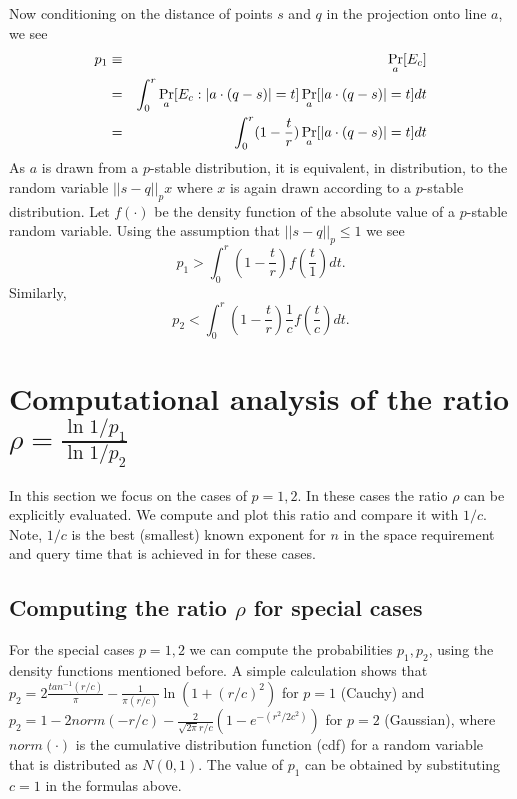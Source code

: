 \documentclass[12pt]{article}
\begin{document}
Now conditioning on the distance of points $s$ and $q$ in the projection
onto line $a$, we see
\begin{eqnarray}
p_1
&\equiv&
\Pr_a[E_c]
\cr&=&
\int_0^r\Pr_a[E_c : |a\cdot(q-s)|=t]\Pr_a[|a\cdot(q-s)|=t]dt
\cr&=&
\int_0^r(1-\frac{t}{r})\Pr_a[|a\cdot(q-s)|=t]dt
\end{eqnarray}
As $a$ is drawn from a $p$-stable distribution, it is equivalent, in
distribution, to the random variable $||s-q||_px$ where $x$ is again
drawn according to a $p$-stable distribution.  Let $f(\cdot)$ be the
density function of the absolute value of a $p$-stable random variable.
Using the assumption
that $||s-q||_p \le 1$
we see
$$p_1>\int_0^r(1-\frac{t}{r})f(\frac{t}{1})dt.$$
Similarly,
$$p_2<\int_0^r(1-\frac{t}{r})\frac{1}{c}f(\frac{t}{c}) dt.$$
\fi

\section{Computational analysis of the ratio $\rho=\frac{\ln 1/p_1}{\ln 1/p_2}$}
\label{s:comp}

In this section we focus on the cases of $p=1,2$. In these cases the 
ratio $\rho$ can be explicitly evaluated.
We compute and plot this ratio
and compare it with $1/c$. Note, $1/c$ is the best (smallest) known
exponent for $n$ in the space requirement and query time that is achieved
in \cite{IM} for these cases. 

\subsection{Computing the ratio $\rho$ for special cases} For the special
cases $p=1,2$ we can compute the probabilities $p_1,p_2$, using the
density functions mentioned before. A simple
calculation shows that $p_2 = 2\frac{tan^{-1}({r/c})}{\pi} - \frac{1}{\pi
(r/c)} \ln ({1 + (r/c)^2})$ for $p=1$ (Cauchy) and
$p_2 = 1 - 2 norm(-r/c) -
\frac{2}{\sqrt{2\pi}r/c}(1 - e^{-(r^2/2c^2)})$ for $p=2$ (Gaussian), where
$norm(\cdot)$ is the cumulative distribution function (cdf) for
a random variable that is distributed as $N(0,1)$.
The value of $p_1$ can be obtained
by substituting $c=1$ in the formulas above.
\end{document}
